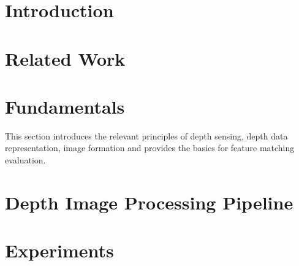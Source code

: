 \documentclass[numbers=noenddot,doktyp=marbeit,fontsize=12pt,sprache=english,hausschrift=true,draft=false]{TUBAFarbeiten}
\begin{document}
\maketitle
\TUBAFErklaerungsseite%

\setcounter{page}{1}

\newpage

\tableofcontents
\newpage



\newpage
{}\listoftables

\newpage
{}\listoffigures

\newpage
{}

\section{Introduction}\label{sec:introduction}

\newpage

\section{Related Work}\label{sec:related_work}

\newpage

\section{Fundamentals}\label{sec:fundamentals}

This section introduces the relevant principles of depth sensing, depth data representation, image formation and provides the basics for feature matching evaluation.






\newpage

\section{Depth Image Processing Pipeline}\label{sec:image_processing}






\newpage

\section{Experiments}\label{sec:experiments}
\end{document}
